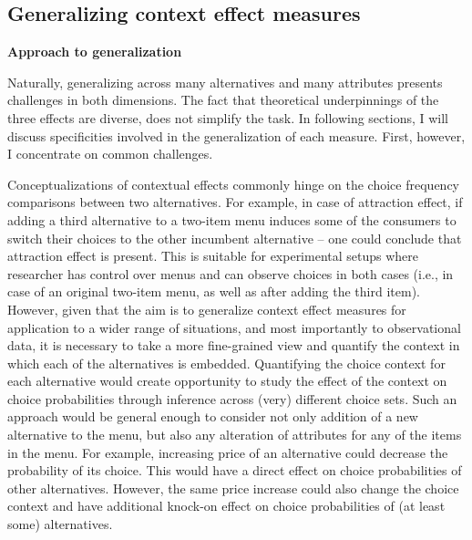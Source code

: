 \documentclass[a4paper,12pt]{article}
\begin{document}
\subsection{Generalizing context effect measures}
\textbf{Approach to generalization}

Naturally, generalizing across many alternatives and many attributes presents challenges in both dimensions. The fact that theoretical underpinnings of the three effects are diverse, does not simplify the task. In following sections, I will discuss specificities involved in the generalization of each measure. First, however, I concentrate on common challenges.

Conceptualizations of contextual effects commonly hinge on the choice frequency comparisons between two alternatives. For example, in case of attraction effect, if adding a third alternative to a two-item menu induces some of the consumers to switch their choices to the other incumbent alternative – one could conclude that attraction effect is present. This is suitable for experimental setups where researcher has control over menus and can observe choices in both cases (i.e., in case of an original two-item menu, as well as after adding the third item). However, given that the aim is to generalize context effect measures for application to a wider range of situations, and most importantly to observational data, it is necessary to take a more fine-grained view and quantify the context in which each of the alternatives is embedded. Quantifying the choice context for each alternative would create opportunity to study the effect of the context on choice probabilities through inference across (very) different choice sets. Such an approach would be general enough to consider not only addition of a new alternative to the menu, but also any alteration of attributes for any of the items in the menu. For example, increasing price of an alternative could decrease the probability of its choice. This would have a direct effect on choice probabilities of other alternatives. However, the same price increase could also change the choice context and have additional knock-on effect on choice probabilities of (at least some) alternatives.
\end{document}
